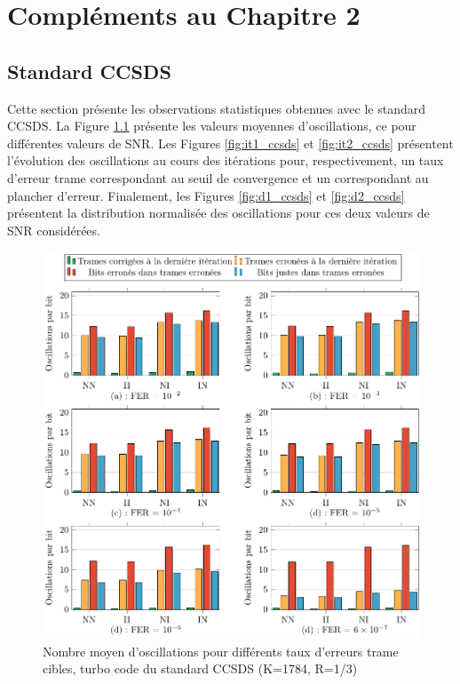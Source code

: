 

\chapter{Compléments au Chapitre 2}
\section{Standard CCSDS}\label{sec:annCCSDS}
Cette section présente les observations statistiques obtenues avec le standard CCSDS. La Figure \ref{fig:m_ccsds} présente 
les valeurs moyennes d'oscillations, ce pour différentes valeurs de SNR. Les Figures \ref{fig:it1_ccsds} et \ref{fig:it2_ccsds}
présentent l'évolution des oscillations au cours des itérations pour, respectivement, un taux d'erreur trame correspondant 
au seuil de convergence et un correspondant au plancher d'erreur. Finalement, les Figures \ref{fig:d1_ccsds} et \ref{fig:d2_ccsds} 
présentent la distribution normalisée des oscillations pour ces deux valeurs de SNR considérées.
\begin{figure}[tb]
	\begin{center}
	\includegraphics[width=.9\textwidth]{main/ch2_fig/tikz/m_ccsds.pdf}
	\caption{Nombre moyen d'oscillations pour différents taux d'erreurs trame cibles, turbo code du standard CCSDS (K=1784, R=1/3) \label{fig:m_ccsds}}
	\end{center}
\end{figure}

